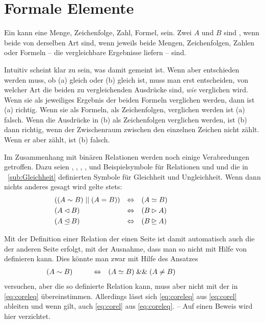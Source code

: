 \section{Formale Elemente}%
\label{sec:Formalelement}

Ein \emph{} kann \textzB eine Menge, Zeichenfolge, Zahl, Formel, \textusw sein.
Zwei  $A$ und $B$ sind \emph{}, wenn beide von derselben Art sind, \textdh wenn \textzB jeweils beide Mengen, Zeichenfolgen, Zahlen oder Formeln -- die vergleichbare Ergebnisse liefern -- sind.

Intuitiv scheint klar zu sein, was damit  gemeint ist.
Wenn aber entschieden werden muss, ob \textzB (a)  gleich  oder (b)  gleich  ist, muss man erst entscheiden, von welcher Art die beiden zu vergleichenden Ausdrücke sind, \textdh \emph{wie} verglichen wird.
Wenn sie als jeweiliges Ergebnis der beiden Formeln verglichen werden, dann ist (a) richtig.
Wenn sie als Formeln, \textdh als Zeichenfolgen, verglichen werden ist (a) falsch.
Wenn die Ausdrücke in (b) als Zeichenfolgen verglichen werden, ist (b) dann richtig, wenn der Zwischenraum zwischen den einzelnen Zeichen nicht zählt.
Wenn er aber zählt, ist (b) falsch.

Im Zusammenhang mit binären Relationen werden noch einige Verabredungen getroffen.
Dazu seien , , , , 	 und  Beispielsymbole für Relationen und  und  die in \sectionname~\vref{sub:Gleichheit} definierten Symbole für Gleichheit und Ungleichheit.
Wenn dann nichts anderes gesagt wird gelte stets:
\begin{align}
& ((A \sim   B) \;||\; (A = B)) & \Leftrightarrow &&& (A \simeq  B)
\label{eq:coreleq}   \\
& (A \lhd   B)                  & \Leftrightarrow &&& (B \rhd   A)
\label{eq:colrrel}   \\
& (A \unlhd B)                  & \Leftrightarrow &&& (B \unrhd A)
\label{eq:colrreleq} &&&&&&&&&&
\end{align}

Mit der Definition einer Relation der einen Seite ist damit automatisch auch die der anderen Seite erfolgt, mit der Ausnahme, dass man  so nicht mit Hilfe von  definieren kann.
Dies könnte man zwar mit Hilfe des Ansatzes
\begin{align}
& (A \sim B) &&&&& \Leftrightarrow &&&
(A \simeq B) \;\&\&\; (A \ne B) \label{eq:corel} &&&&&&&&&&
\end{align}
versuchen, aber die so definierte Relation \symqt{$\relbsp$} kann, muss aber nicht mit der in \ref{eq:coreleq} übereinstimmen.
Allerdings lässt sich \ref{eq:coreleq} aus \ref{eq:corel} ableiten und wenn  gilt, auch \ref{eq:corel} aus \ref{eq:coreleq}.
-- Auf einen Beweis wird hier verzichtet.


